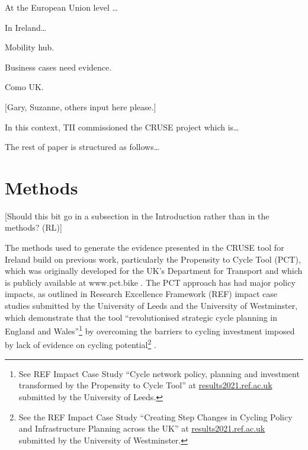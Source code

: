 \documentclass[
  super,
  preprint,
  3p]{elsarticle}
\begin{document}
At the European Union level \ldots{}

In Ireland\ldots{}

Mobility hub.

Business cases need evidence.

Como UK.

{[}Gary, Suzanne, others input here please.{]}

In this context, TII commissioned the CRUSE project which is\ldots{}

The rest of paper is structured as follows\ldots{}

\hypertarget{methods}{%
\section{Methods}\label{methods}}

{[}Should this bit go in a subsection in the Introduction rather than in
the methods? (RL){]}

The methods used to generate the evidence presented in the CRUSE tool
for Ireland build on previous work, particularly the Propensity to Cycle
Tool (PCT), which was originally developed for the UK's Department for
Transport and which is publicly available at www.pct.bike
\citep{lovelace2017}. The PCT approach has had major policy impacts, as
outlined in Research Excellence Framework (REF) impact case studies
submitted by the University of Leeds and the University of Westminster,
which demonstrate that the tool ``revolutionised strategic cycle
planning in England and Wales''\footnote{See REF Impact Case Study
  ``Cycle network policy, planning and investment transformed by the
  Propensity to Cycle Tool'' at
  \href{https://results2021.ref.ac.uk/impact/847d1191-7f25-46ba-a399-b481125edc8f}{results2021.ref.ac.uk}
  submitted by the University of Leeds.} by overcoming the barriers to
cycling investment imposed by lack of evidence on cycling
potential\footnote{See the REF Impact Case Study ``Creating Step Changes
  in Cycling Policy and Infrastructure Planning across the UK'' at
  \href{https://results2021.ref.ac.uk/impact/4BBF3436-FD10-4C75-9791-F5E98AB4411B}{results2021.ref.ac.uk}
  submitted by the University of Westminster.} .
\end{document}
